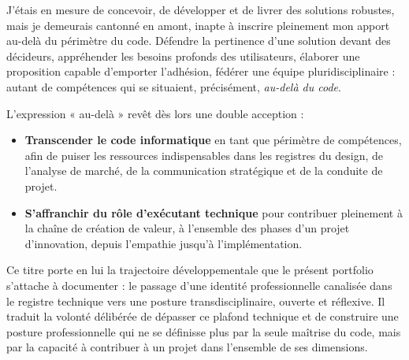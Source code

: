 J'étais en mesure de concevoir, de développer et de livrer des solutions robustes, mais je demeurais cantonné en amont, inapte à inscrire pleinement mon apport au-delà du périmètre du code. Défendre la pertinence d'une solution devant des décideurs, appréhender les besoins profonds des utilisateurs, élaborer une proposition capable d'emporter l'adhésion, fédérer une équipe pluridisciplinaire : autant de compétences qui se situaient, précisément, \textit{au-delà du code}.

\medskip

L'expression « au-delà » revêt dès lors une double acception :

\begin{itemize}
    \item \textbf{Transcender le code informatique} en tant que périmètre de compétences, afin de puiser les ressources indispensables dans les registres du design, de l'analyse de marché, de la communication stratégique et de la conduite de projet.
    \item \textbf{S'affranchir du rôle d'exécutant technique} pour contribuer pleinement à la chaîne de création de valeur, à l'ensemble des phases d'un projet d'innovation, depuis l'empathie jusqu'à l'implémentation.
\end{itemize}

\medskip

Ce titre porte en lui la trajectoire développementale que le présent portfolio s'attache à documenter : le passage d'une identité professionnelle canalisée dans le registre technique vers une posture transdisciplinaire, ouverte et réflexive. Il traduit la volonté délibérée de dépasser ce plafond technique et de construire une posture professionnelle qui ne se définisse plus par la seule maîtrise du code, mais par la capacité à contribuer à un projet dans l'ensemble de ses dimensions.

\clearpage
\ClearShipoutPictureBG
